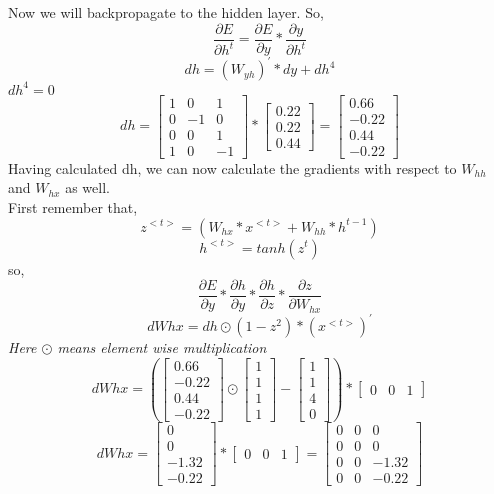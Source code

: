 \documentclass[12pt,letterpaper]{article}
\begin{document}
Now we will backpropagate to the hidden layer.
So,
\[
\frac{\partial{E}}{\partial{h^{t}}} = \frac{\partial{E}}{\partial{y}}*\frac{\partial{y}}{\partial{
h^{t}}}
\]
\[
dh = (W_{yh})^{'}*dy + dh^{4}
\]
$dh^{4} = 0$
\[
dh = \begin{bmatrix}
1&0&1\\
0&-1&0\\
0&0&1\\
1&0&-1
\end{bmatrix}*\begin{bmatrix}
0.22\\0.22\\0.44
\end{bmatrix} = \begin{bmatrix}
0.66\\
-0.22\\
0.44\\
-0.22
\end{bmatrix}
\]
Having calculated dh, we can now calculate the gradients with respect to $W_{hh}$ and $W_{hx}$ as well.
\\
First remember that,
\[
z^{<t>} = (W_{hx}*x^{<t>}+W_{hh}*h^{t-1}) 
\]
\[
h^{<t>} = tanh(z^{t})
\]
so,
\[
\frac{\partial{E}}{\partial{y}}*\frac{\partial{h}}{\partial{y}}*\frac{\partial{h}}{\partial{z}}*\frac{\partial{z}}{\partial{W_{hx}}}
\]
\[
dWhx = dh\odot(1-z^{2})*(x^{<t>})^{'}
\]
\textit{Here $\odot$ means element wise multiplication}
\[
dWhx = (\begin{bmatrix}
0.66\\
-0.22\\
0.44\\
-0.22
\end{bmatrix}\odot\begin{bmatrix}
1\\1\\1\\1
\end{bmatrix}-\begin{bmatrix}
1\\1\\4\\0
\end{bmatrix})*\begin{bmatrix}
0&0&1
\end{bmatrix}
\]
\[
dWhx = \begin{bmatrix}
0\\0\\-1.32\\-0.22
\end{bmatrix}*\begin{bmatrix}
0&0&1
\end{bmatrix} = \begin{bmatrix}
0&0&0\\
0&0&0\\
0&0&-1.32\\
0&0&-0.22
\end{bmatrix}
\]
\end{document}
